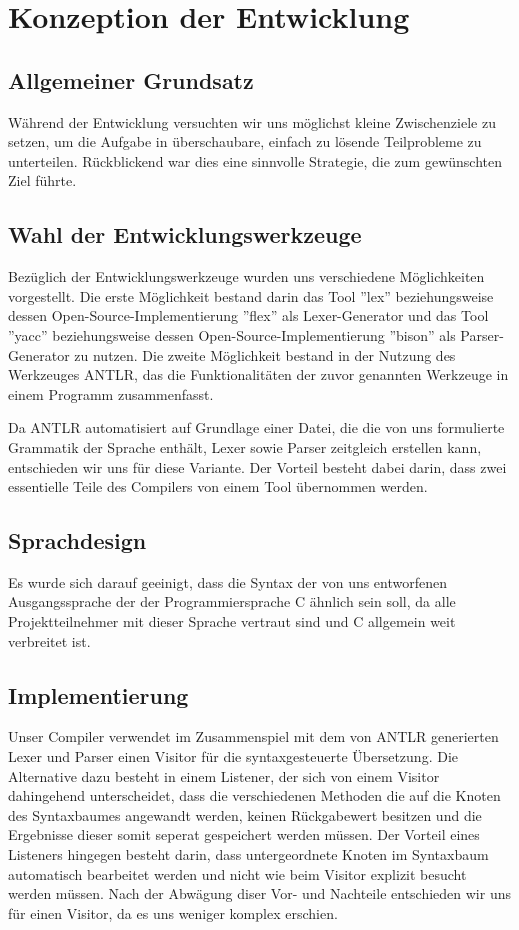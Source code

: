 \section{Konzeption der Entwicklung}
\subsection{Allgemeiner Grundsatz}
Während der Entwicklung versuchten wir uns möglichst kleine Zwischenziele zu setzen, um die Aufgabe in überschaubare, einfach zu lösende Teilprobleme zu unterteilen. Rückblickend war dies eine sinnvolle Strategie, die zum gewünschten Ziel führte.

\subsection{Wahl der Entwicklungswerkzeuge}
Bezüglich der Entwicklungswerkzeuge wurden uns verschiedene Möglichkeiten vorgestellt. Die erste Möglichkeit bestand darin das Tool ''lex'' beziehungsweise dessen Open-Source-Implementierung ''flex'' als Lexer-Generator und das Tool ''yacc'' beziehungsweise dessen Open-Source-Implementierung ''bison'' als Parser-Generator zu nutzen. Die zweite Möglichkeit bestand in der Nutzung des Werkzeuges ANTLR, das die Funktionalitäten der zuvor genannten Werkzeuge in einem Programm zusammenfasst.

Da ANTLR automatisiert auf Grundlage einer Datei, die die von uns formulierte Grammatik der Sprache enthält, Lexer sowie Parser zeitgleich erstellen kann, entschieden wir uns für diese Variante. Der Vorteil besteht dabei darin, dass zwei essentielle Teile des Compilers von einem Tool übernommen werden. 

\subsection{Sprachdesign}
Es wurde sich darauf geeinigt, dass die Syntax der von uns entworfenen Ausgangssprache der der Programmiersprache C ähnlich sein soll, da alle Projektteilnehmer mit dieser Sprache vertraut sind und C allgemein weit verbreitet ist.

\subsection{Implementierung}
Unser Compiler verwendet im Zusammenspiel mit dem von ANTLR generierten Lexer und Parser einen Visitor für die syntaxgesteuerte Übersetzung. Die Alternative dazu besteht in einem Listener, der sich von einem Visitor dahingehend unterscheidet, dass die verschiedenen Methoden die auf die Knoten des Syntaxbaumes angewandt werden, keinen Rückgabewert besitzen und die Ergebnisse dieser somit seperat gespeichert werden müssen. Der Vorteil eines Listeners hingegen besteht darin, dass untergeordnete Knoten im Syntaxbaum automatisch bearbeitet werden und nicht wie beim Visitor explizit besucht werden müssen. Nach der Abwägung diser Vor- und Nachteile entschieden wir uns für einen Visitor, da es uns weniger komplex erschien.



